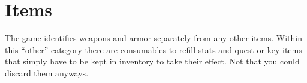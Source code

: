 \chapter{Items}

The game identifies weapons and armor separately from any other items. Within this “other” category there are consumables to refill stats and quest or key items that simply have to be kept in inventory to take their effect. Not that you could discard them anyways.

\newpage

\newpage

\newpage

\newpage

\newpage

\newpage

\newpage

\newpage

\newpage

\newpage

\newpage

\newpage

\newpage

\newpage

\newpage

\newpage

\newpage

\newpage

\newpage

\newpage

